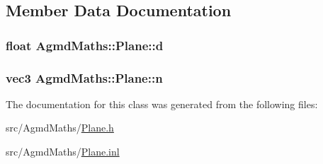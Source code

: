 \subsection{Member Data Documentation}
\hypertarget{class_agmd_maths_1_1_plane_a2dcb3b56f27ca1b2ce4997e9a13fb645}{
\subsubsection[{d}]{\setlength{\rightskip}{0pt plus 5cm}float Agmd\+Maths\+::\+Plane\+::d}}\label{class_agmd_maths_1_1_plane_a2dcb3b56f27ca1b2ce4997e9a13fb645}
\hypertarget{class_agmd_maths_1_1_plane_a0b45b5f1795f8d8b08aef61c45d0c72e}{
\subsubsection[{n}]{\setlength{\rightskip}{0pt plus 5cm}vec3 Agmd\+Maths\+::\+Plane\+::n}}\label{class_agmd_maths_1_1_plane_a0b45b5f1795f8d8b08aef61c45d0c72e}


The documentation for this class was generated from the following files\+:\begin{DoxyCompactItemize}
\item 
src/\+Agmd\+Maths/\hyperlink{_agmd_maths_2_plane_8h}{Plane.\+h}\item 
src/\+Agmd\+Maths/\hyperlink{_plane_8inl}{Plane.\+inl}\end{DoxyCompactItemize}
